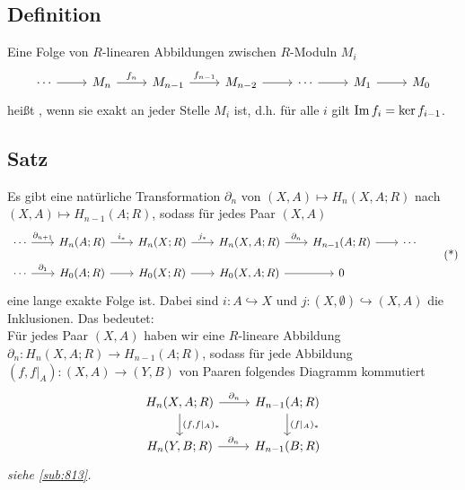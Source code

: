 \subsection[Definition: Lange exakte Sequenz von $R$-Moduln]{Definition} %
\label{sub:87}
Eine Folge von $R$-linearen Abbildungen zwischen $R$-Moduln $M_i$
\[
	\begin{tikzcd}
		\cdots \rar & M_n \rar["f_n"]  & M_{n-1} \rar["f_{n-1}"] & M_{n-2} \rar & \cdots \rar & M_1 \rar & M_0
	\end{tikzcd}
\]
heißt , wenn sie exakt an jeder Stelle $M_i$ ist, d.h. für alle $i$ gilt $\operatorname{Im} f_i = \ker f_{i-1}$.

\subsection[Satz: Existenz der Paarsequenz]{Satz} %
\label{sub:88}
Es gibt eine natürliche Transformation $\partial_n$ von $(X,A) \mapsto H_n(X,A;R)$ nach $(X,A) \mapsto H_{n-1}(A;R)$, sodass für jedes Paar $(X,A)$
\begin{equation*}
	\begin{tikzcd}[row sep=1em, column sep=2em]
		\cdots  \rar["\partial_{n+1}"] & H_n(A;R) \rar["i_*"] & H_n(X;R) \rar["j_*"] & H_n(X,A;R) \rar["\partial_n"] 
		& H_{n-1}(A;R) \rar & \cdots \\
		\cdots \rar["\partial_1"] & H_0(A;R) \rar & H_0(X;R) \rar & H_0(X,A;R) \rar & 0
	\end{tikzcd} \label{eq:88}\tag{*}
\end{equation*}
eine lange exakte Folge ist. Dabei sind $i \colon A \hookrightarrow X$ und $j \colon (X,\emptyset) \hookrightarrow (X,A)$ die Inklusionen. Das bedeutet: \smallskip\\
Für jedes Paar $(X,A)$ haben wir eine $R$-lineare Abbildung $\partial_n \colon H_n(X,A;R) \to H_{n-1}(A;R)$, sodass für jede Abbildung $(f,f|_{A}) \colon (X,A) \to (Y,B)$ von Paaren
folgendes Diagramm kommutiert
\[
	\begin{tikzcd}
		H_{n}(X,A;R) \rar["\partial_n"] \dar["{(f,f|_A)_*}"] & H_{n-1}(A;R) \dar["{(f|_A)_*}"] \\
		H_n(Y,B;R) \rar["\partial_n"] & H_{n-1}(B;R)
	\end{tikzcd}
\]
\emph{siehe \ref{sub:813}.}

